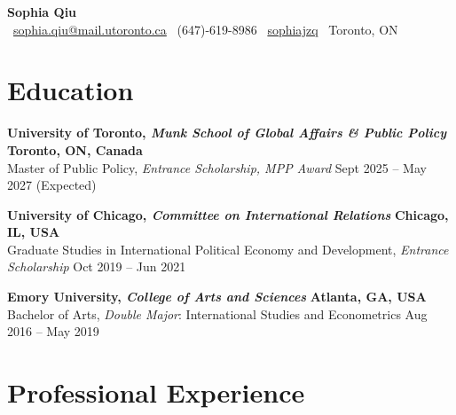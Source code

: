 \documentclass[11pt]{article}
\begin{document}
\begin{center}
    {\LARGE \textbf{Sophia Qiu}} \\
    \vspace{6pt}
    \faEnvelope\ \href{mailto:sophia.qiu@mail.utoronto.ca}{sophia.qiu@mail.utoronto.ca} \quad
    \faPhone\ (647)-619-8986 \quad
    \faLinkedin\ \href{https://www.linkedin.com/in/sophiajzq}{sophiajzq} \quad
    \faMapMarker\ Toronto, ON \quad
\end{center}

\vspace{-6pt}

\section*{Education}

\textbf{University of Toronto, \textit{Munk School of Global Affairs \& Public Policy}} \hfill \textbf{Toronto, ON, Canada} \\
Master of Public Policy, \textit{Entrance Scholarship, MPP Award} \hfill Sept 2025 -- May 2027 (Expected)

\vspace{4pt}

\textbf{University of Chicago, \textit{Committee on International Relations}} \hfill \textbf{Chicago, IL, USA} \\
Graduate Studies in International Political Economy and Development, \textit{Entrance Scholarship} \hfill Oct 2019 -- Jun 2021

\vspace{4pt}

\textbf{Emory University, \textit{College of Arts and Sciences}} \hfill \textbf{Atlanta, GA, USA} \\
Bachelor of Arts, \textit{Double Major}: International Studies and Econometrics \hfill Aug 2016 -- May 2019

\section*{Professional Experience}
\end{document}
